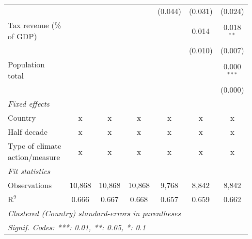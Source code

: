 \begin{tabular}{lcccccc}
                                                   &         &               &                & (0.044)        & (0.031)        & (0.024)\\   
   Tax revenue (\% of GDP)                         &         &               &                &                & 0.014          & 0.018$^{**}$\\   
                                                   &         &               &                &                & (0.010)        & (0.007)\\   
   Population total                                &         &               &                &                &                & 0.000$^{***}$\\   
                                                   &         &               &                &                &                & (0.000)\\   
   \emph{Fixed effects}\\
   Country                                         & x       & x             & x              & x              & x              & x\\  
   Half decade                                     & x       & x             & x              & x              & x              & x\\  
   Type of climate action/measure                  & x       & x             & x              & x              & x              & x\\  
   \midrule \emph{Fit statistics}\\
   Observations                                    & 10,868  & 10,868        & 10,868         & 9,768          & 8,842          & 8,842\\  
   R$^2$                                           & 0.666   & 0.667         & 0.668          & 0.657          & 0.659          & 0.662\\  
   \midrule
   \multicolumn{7}{l}{\emph{Clustered (Country) standard-errors in parentheses}}\\
   \multicolumn{7}{l}{\emph{Signif. Codes: ***: 0.01, **: 0.05, *: 0.1}}\\
\end{tabular}
\par\endgroup


